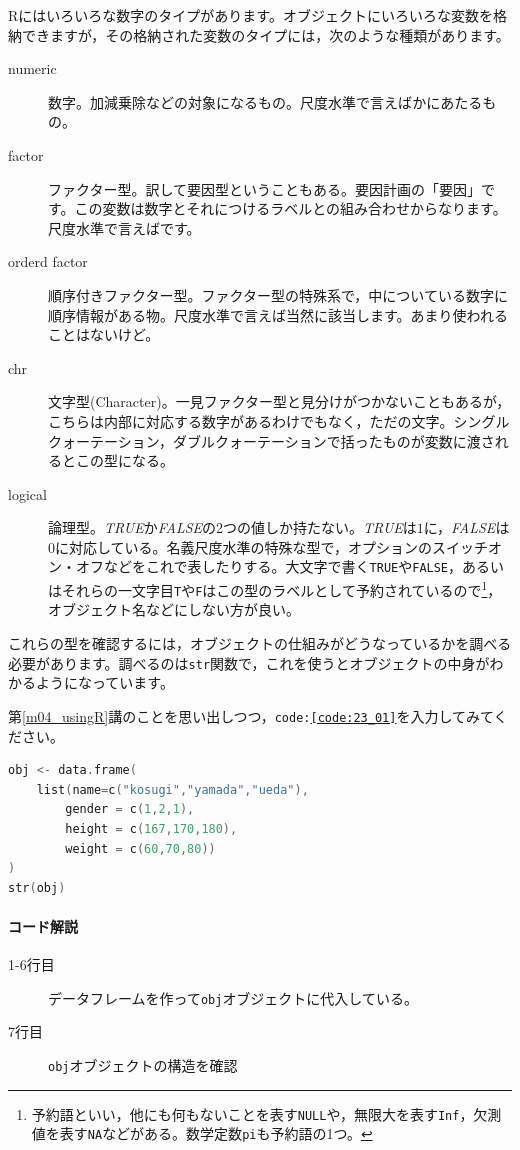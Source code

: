 \documentclass{ltjbook}
\begin{document}
Rにはいろいろな数字のタイプがあります。オブジェクトにいろいろな変数を格納できますが，その格納された変数のタイプには，次のような種類があります。
\begin{description}
	\item[numeric] 数字。加減乗除などの対象になるもの。尺度水準で言えばかにあたるもの。
	\item[factor] ファクター型。訳して要因型ということもある。要因計画の「要因」です。この変数は数字とそれにつけるラベルとの組み合わせからなります。尺度水準で言えばです。
	\item[orderd factor] 順序付きファクター型。ファクター型の特殊系で，中についている数字に順序情報がある物。尺度水準で言えば当然に該当します。あまり使われることはないけど。
	\item[chr] 文字型(Character)。一見ファクター型と見分けがつかないこともあるが，こちらは内部に対応する数字があるわけでもなく，ただの文字。シングルクォーテーション，ダブルクォーテーションで括ったものが変数に渡されるとこの型になる。
	\item[logical] 論理型。\textit{TRUE}か\textit{FALSE}の2つの値しか持たない。\textit{TRUE}は$1$に，\textit{FALSE}は$0$に対応している。名義尺度水準の特殊な型で，オプションのスイッチオン・オフなどをこれで表したりする。大文字で書く\texttt{TRUE}や\texttt{FALSE}，あるいはそれらの一文字目\texttt{T}や\texttt{F}はこの型のラベルとして予約されているので\footnote{予約語といい，他にも何もないことを表す\texttt{NULL}や，無限大を表す\texttt{Inf}，欠測値を表す\texttt{NA}などがある。数学定数\texttt{pi}も予約語の1つ。}，オブジェクト名などにしない方が良い。
\end{description}
これらの型を確認するには，オブジェクトの仕組みがどうなっているかを調べる必要があります。調べるのは\texttt{str}関数で，これを使うとオブジェクトの中身がわかるようになっています。

第\ref{m04_usingR}講のことを思い出しつつ，\texttt{code:\ref{code:23_01}}を入力してみてください。
\begin{lstlisting}[language=c++,label={code:23_01},caption={オブジェクトに代入}]
obj <- data.frame(
    list(name=c("kosugi","yamada","ueda"),
        gender = c(1,2,1),
        height = c(167,170,180),
        weight = c(60,70,80))
)
str(obj)
\end{lstlisting}
\paragraph{コード解説}
\begin{description}
	\item[1-6行目] データフレームを作って\texttt{obj}オブジェクトに代入している。
	\item[7行目] \texttt{obj}オブジェクトの構造を確認
\end{description}
\end{document}

